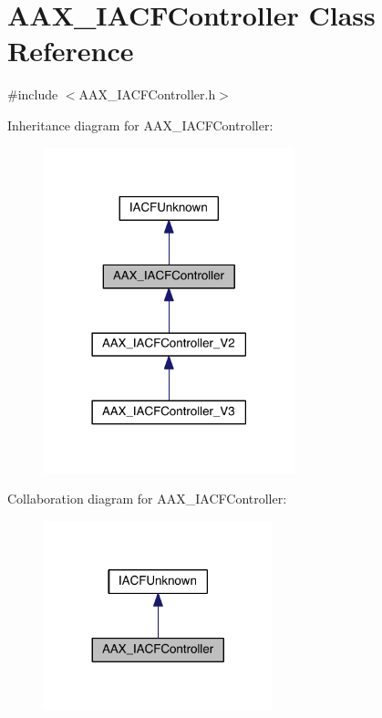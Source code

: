 \hypertarget{a00053}{}\section{A\+A\+X\+\_\+\+I\+A\+C\+F\+Controller Class Reference}
\label{a00053}


{\ttfamily \#include $<$A\+A\+X\+\_\+\+I\+A\+C\+F\+Controller.\+h$>$}



Inheritance diagram for A\+A\+X\+\_\+\+I\+A\+C\+F\+Controller\+:
\nopagebreak
\begin{figure}[H]
\begin{center}
\leavevmode
\includegraphics[width=206pt]{a00502}
\end{center}
\end{figure}


Collaboration diagram for A\+A\+X\+\_\+\+I\+A\+C\+F\+Controller\+:
\nopagebreak
\begin{figure}[H]
\begin{center}
\leavevmode
\includegraphics[width=188pt]{a00503}
\end{center}
\end{figure}


